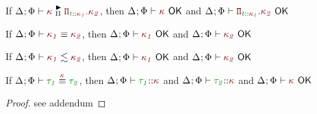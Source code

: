 \documentclass[11pt]{article}
\begin{document}
    \begin{theorem}[OK-MatchPi]
        If $\MatchedPiKind{\knd}$, then $\KindWellFormed$ and $\KindWellFormed[\DepFunKind]$
    \end{theorem}
    \begin{theorem}[OK-KEquiv]
        If $\KindEquiv{\knd[1]}{\knd[2]}$, then $\KindWellFormed[{\knd[1]}]$ and $\KindWellFormed[{\knd[2]}]$
    \end{theorem}
    \begin{theorem}[OK-CSK]
        If $\ConsistentSubKind{\knd[1]}{\knd[2]}$, then $\KindWellFormed[{\knd[1]}]$ and $\KindWellFormed[{\knd[2]}]$
    \end{theorem}
    \begin{theorem}[OK-EquivAK]
        If $\TypeEquivAtKind{\typ[1]}{\typ[2]}$, then $\WellFormedAtKind{\typ[1]}$ and $\WellFormedAtKind{\typ[2]}$ and $\KindWellFormed$
    \end{theorem}
    \begin{proof}
        see addendum
    \end{proof}
    \noindent\hrulefill
    \newpage
    \recalctypearea
\end{document}
